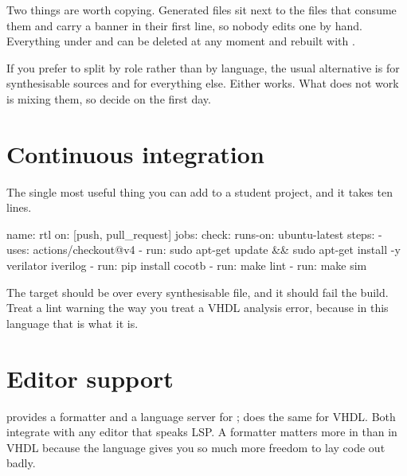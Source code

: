 Two things are worth copying. Generated files sit next to the files that
consume them and carry a  banner in their first line, so nobody
edits one by hand. Everything under  and  can be
deleted at any moment and rebuilt with .

If you prefer to split by role rather than by language, the usual alternative
is  for synthesisable sources and  for everything else.
Either works. What does not work is mixing them, so decide on the first day.

\section{Continuous integration}

The single most useful thing you can add to a student project, and it takes
ten lines.

\begin{txtcode}
name: rtl
on: [push, pull_request]
jobs:
  check:
    runs-on: ubuntu-latest
    steps:
      - uses: actions/checkout@v4
      - run: sudo apt-get update && sudo apt-get install -y verilator iverilog
      - run: pip install cocotb
      - run: make lint
      - run: make sim
\end{txtcode}

The  target should be  over every
synthesisable file, and it should fail the build. Treat a lint warning the way
you treat a VHDL analysis error, because in this language that is what it is.

\section{Editor support}

 provides a formatter and a language server for \SV{}; 
does the same for VHDL. Both integrate with any editor that speaks LSP. A
formatter matters more in \SV{} than in VHDL because the language gives you
so much more freedom to lay code out badly.
